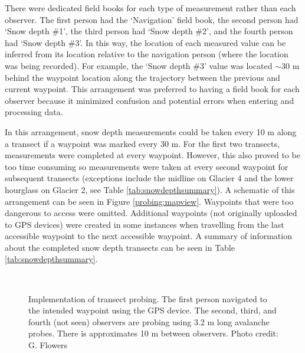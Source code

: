 \documentclass[12pt]{article}
\begin{document}
There were dedicated field books for each type of measurement rather than each observer. The first person had the `Navigation' field book, the second person had `Snow depth \#1', the third person had `Snow depth \#2', and the fourth person had `Snow depth \#3'. In this way, the location of each measured value can be inferred from its location relative to the navigation person (where the location was being recorded). For example, the `Snow depth \#3' value was located $\sim$30 m behind the waypoint location along the trajectory between the previous and current waypoint. This arrangement was preferred to having a field book for each observer because it minimized confusion and potential errors when entering and processing data.

In this arrangement, snow depth measurements could be taken every 10 m along a transect if a waypoint was marked every 30 m. For the first two transects, measurements were completed at every waypoint. However, this also proved to be too time consuming so measurements were taken at every second waypoint for subsequent transects (exceptions include the midline on Glacier 4 and the lower hourglass on Glacier 2, see Table \ref{tab:snowdepthsummary}). A schematic of this arrangement can be seen in Figure \ref{probing:mapview}. Waypoints that were too dangerous to access were omitted. Additional waypoints (not originally uploaded to GPS devices) were created in some instances when travelling from the last accessible waypoint to the next accessible waypoint. A summary of information about the completed snow depth transects can be seen in Table \ref{tab:snowdepthsummary}.

\begin{figure}
	\centering
	\\
	\caption{Implementation of transect probing. The first person navigated to the intended waypoint using the GPS device. The second, third, and fourth (not seen) observers are probing using 3.2 m long avalanche probes. There is approximates 10 m between observers. Photo credit: G. Flowers}
	\label{photo_probing}
	\end{figure}
\end{document}
